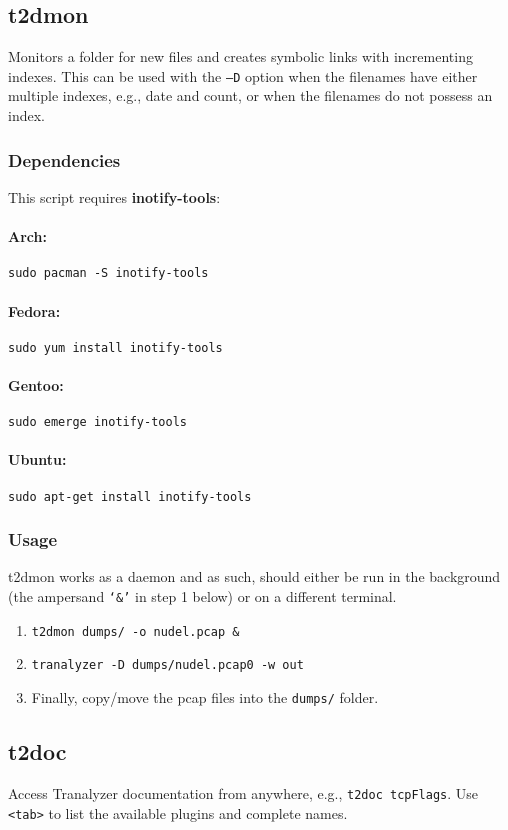 \documentclass[documentation]{subfiles}
\begin{document}
\subsection{t2dmon}\label{t2dmon}
Monitors a folder for new files and creates symbolic links with incrementing indexes.
This can be used with the {\tt --D} option when the filenames have either multiple indexes, e.g., date and count, or when the filenames do not possess an index.

\subsubsection{Dependencies}
This script requires {\bf inotify-tools}:
\paragraph{Arch:} {\tt sudo pacman -S inotify-tools}
\paragraph{Fedora:} {\tt sudo yum install inotify-tools}
\paragraph{Gentoo:} {\tt sudo emerge inotify-tools}
\paragraph{Ubuntu:} {\tt sudo apt-get install inotify-tools}

\subsubsection{Usage}
t2dmon works as a daemon and as such, should either be run in the background (the ampersand {\tt `\&'} in step 1 below) or on a different terminal.
\begin{enumerate}
    \item {\tt t2dmon dumps/ -o nudel.pcap \&}
    \item {\tt tranalyzer -D dumps/nudel.pcap0 -w out}
    \item Finally, copy/move the pcap files into the {\tt dumps/} folder.
\end{enumerate}

\subsection{t2doc}\label{t2doc}
Access Tranalyzer documentation from anywhere, e.g., {\tt t2doc tcpFlags}.
Use {\tt <tab>} to list the available plugins and complete names.
\end{document}
